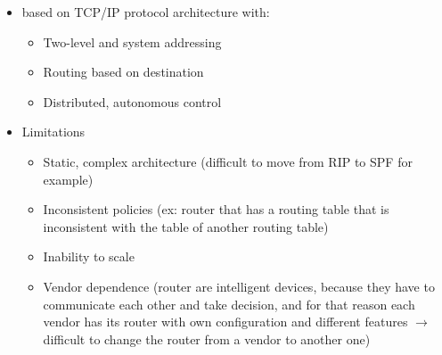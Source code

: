 \documentclass{article}
\begin{document}
      \begin{itemize}
        \item based on TCP/IP protocol architecture with:
          \begin{itemize}
            \item Two-level and system addressing
            \item Routing based on destination
            \item Distributed, autonomous control
          \end{itemize}
        \item Limitations
          \begin{itemize}
            \item Static, complex architecture (difficult to move from RIP to SPF for example)
            \item Inconsistent policies (ex: router that has a routing table that is inconsistent with the table of another routing table)
            \item Inability to scale 
            \item Vendor dependence (router are intelligent devices, because they have to communicate each other and take decision, and for that reason each vendor has its router with own configuration and different features $\rightarrow$ difficult to change the router from a vendor to another one)
          \end{itemize}
      \end{itemize}
\end{document}
